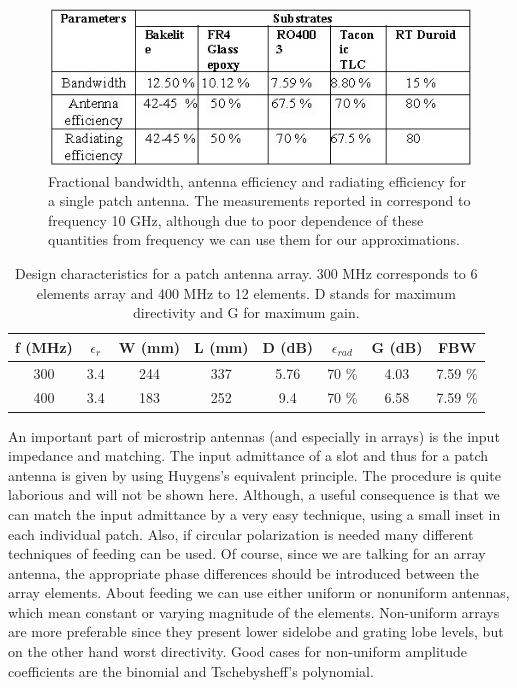 \begin{figure}[htb]
\centering
\includegraphics[width=.75\textwidth]{figures/Yannis/results.jpg}
\caption{Fractional bandwidth, antenna efficiency and radiating efficiency for a single patch antenna. The measurements reported in \cite{substrates} correspond to frequency 10 GHz, although due to poor dependence of these quantities from frequency we can use them for our approximations.}
\label{array result}
\end{figure}

\begin{table}[htb]
\centering
\begin{tabular}{| c | c | c | c | c | c | c | c |}
\hline
 \textbf{f (MHz)} & \textbf{$\epsilon_{r}$} & \textbf{W (mm)} & \textbf{L (mm)} & \textbf{D (dB)} & \textbf{$\epsilon_{rad}$} & \textbf{G (dB)} & FBW \\ 
 \hline
 300 & 3.4 & 244 & 337 & 5.76 & 70 \% & 4.03 & 7.59 \% \\
 \hline
 400 & 3.4 & 183 & 252 & 9.4 & 70 \% & 6.58 & 7.59 \% \\
 \hline
\end{tabular}
\caption{Design characteristics for a patch antenna array. 300 MHz corresponds to 6 elements array and 400 MHz to 12 elements. D stands for maximum directivity and G for maximum gain.}
\label{table: results}
\end{table}

\noindent
An important part of microstrip antennas (and especially in arrays) is the input impedance and matching. The input admittance of a slot and thus for a patch antenna is given by using Huygens's equivalent principle. The procedure is quite laborious and will not be shown here. Although, a useful consequence is that we can match the input admittance by a very easy technique, using a small inset in each individual patch. Also, if circular polarization is needed many different techniques of feeding can be used. Of course, since we are talking for an array antenna, the appropriate phase differences should be introduced between the array elements. About feeding we can use either uniform or nonuniform antennas, which mean constant or varying magnitude of the elements. Non-uniform arrays are more preferable since they present lower sidelobe and grating lobe levels, but on the other hand worst directivity. Good cases for non-uniform amplitude coefficients are the binomial and Tschebysheff's polynomial. 

